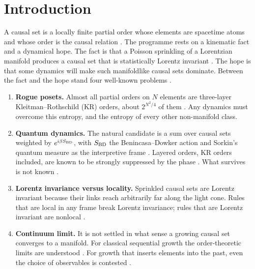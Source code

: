\hypertarget{introduction}{%
\section{Introduction}\label{introduction}}

A causal set is a locally finite partial order whose
elements are spacetime atoms and whose order is the causal
relation \cite{BLMS87, Surya19}. The programme rests on a
kinematic fact and a dynamical hope. The fact is that a
Poisson sprinkling of a Lorentzian manifold produces a
causal set that is statistically Lorentz invariant
\cite{BHS09}. The hope is that some dynamics will make such
manifoldlike causal sets dominate. Between the fact and the
hope stand four well-known problems
\cite{Surya19, Carlip24}.

\begin{enumerate}
\def\labelenumi{\arabic{enumi}.}
\tightlist
\item
  \textbf{Rogue posets.} Almost all partial orders on \(N\)
  elements are three-layer Kleitman--Rothschild (KR) orders,
  about \(2^{N^2/4}\) of them \cite{KR75}. Any dynamics
  must overcome this entropy, and the entropy of every other
  non-manifold class.
\item
  \textbf{Quantum dynamics.} The natural candidate is a sum
  over causal sets weighted by \(e^{i\beta S_{\rm BD}}\),
  with \(S_{\rm BD}\) the Benincasa--Dowker action
  \cite{BD10, DG13} and Sorkin's quantum measure as the
  interpretive frame \cite{Sorkin94}. Layered orders, KR
  orders included, are known to be strongly suppressed by
  the phase \cite{LC18, CCS23, CCS24}. What survives is not
  known \cite{Carlip24}.
\item
  \textbf{Lorentz invariance versus locality.} Sprinkled
  causal sets are Lorentz invariant because their links
  reach arbitrarily far along the light cone. Rules that are
  local in any frame break Lorentz invariance; rules that
  are Lorentz invariant are nonlocal
  \cite{BHS09, Sorkin07}.
\item
  \textbf{Continuum limit.} It is not settled in what sense
  a growing causal set converges to a manifold. For
  classical sequential growth \cite{RS00} the
  order-theoretic limits are understood \cite{BGe10}. For
  growth that inserts elements into the past, even the
  choice of observables is contested \cite{BDZ21}.
\end{enumerate}

